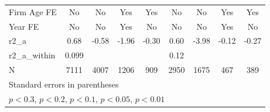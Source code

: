 {\begin{tabular}{l*{8}{c}}
\addlinespace
Firm Age FE         &          No         &          No         &         Yes         &         Yes         &          No         &          No         &         Yes         &         Yes         \\
\addlinespace
Year FE             &          No         &          No         &         Yes         &          No         &          No         &          No         &         Yes         &          No         \\
\midrule
r2\_a                &        0.68         &       -0.58         &       -1.96         &       -0.30         &        0.60         &       -3.98         &       -0.12         &       -0.27         \\
r2\_a\_within         &       0.099         &                     &                     &                     &        0.12         &                     &                     &                     \\
N                   &        7111         &        4007         &        1206         &         909         &        2950         &        1675         &         467         &         389         \\
\bottomrule
\multicolumn{9}{l}{\footnotesize Standard errors in parentheses}\\
\multicolumn{9}{l}{\footnotesize \sym{++} \(p<0.3\), \sym{+} \(p<0.2\), \sym{*} \(p<0.1\), \sym{**} \(p<0.05\), \sym{***} \(p<0.01\)}\\
\end{tabular}
}
